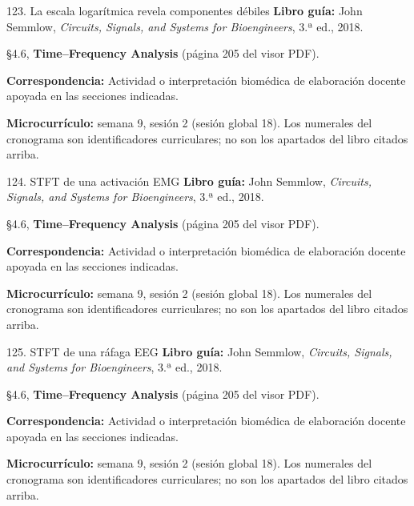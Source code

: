 \documentclass[
  10pt,
  ignorenonframetext,
  aspectratio=169,
  spanish,
]{beamer}
\begin{document}
\begin{frame}{123. La escala logarítmica revela componentes débiles}
\label{la-escala-logaruxedtmica-revela-componentes-duxe9biles}
\textbf{Libro guía:} John Semmlow, \emph{Circuits, Signals, and Systems
for Bioengineers}, 3.ª ed., 2018.

§4.6, \textbf{Time--Frequency Analysis} (página 205 del visor PDF).

\textbf{Correspondencia:} Actividad o interpretación biomédica de
elaboración docente apoyada en las secciones indicadas.

\textbf{Microcurrículo:} semana 9, sesión 2 (sesión global 18). Los
numerales del cronograma son identificadores curriculares; no son los
apartados del libro citados arriba.
\end{frame}

\begin{frame}{124. STFT de una activación EMG}
\label{stft-de-una-activaciuxf3n-emg}
\textbf{Libro guía:} John Semmlow, \emph{Circuits, Signals, and Systems
for Bioengineers}, 3.ª ed., 2018.

§4.6, \textbf{Time--Frequency Analysis} (página 205 del visor PDF).

\textbf{Correspondencia:} Actividad o interpretación biomédica de
elaboración docente apoyada en las secciones indicadas.

\textbf{Microcurrículo:} semana 9, sesión 2 (sesión global 18). Los
numerales del cronograma son identificadores curriculares; no son los
apartados del libro citados arriba.
\end{frame}

\begin{frame}{125. STFT de una ráfaga EEG}
\label{stft-de-una-ruxe1faga-eeg}
\textbf{Libro guía:} John Semmlow, \emph{Circuits, Signals, and Systems
for Bioengineers}, 3.ª ed., 2018.

§4.6, \textbf{Time--Frequency Analysis} (página 205 del visor PDF).

\textbf{Correspondencia:} Actividad o interpretación biomédica de
elaboración docente apoyada en las secciones indicadas.

\textbf{Microcurrículo:} semana 9, sesión 2 (sesión global 18). Los
numerales del cronograma son identificadores curriculares; no son los
apartados del libro citados arriba.
\end{frame}
\end{document}
